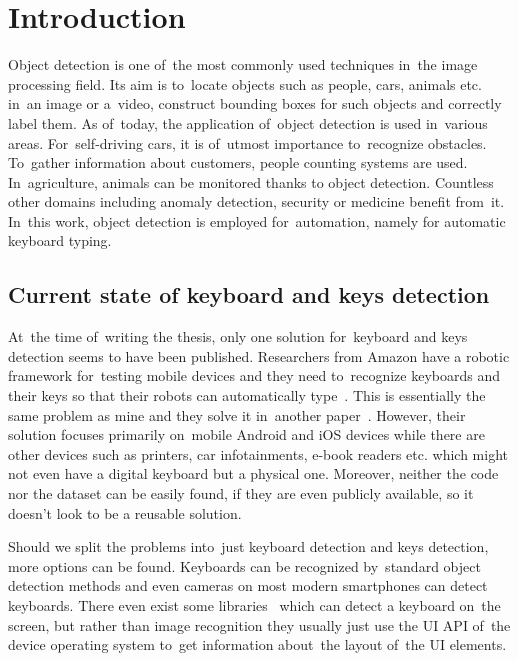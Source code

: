 \chapter{Introduction}
\label{introduction}

Object detection is one of~the most commonly used techniques in~the image processing field. Its aim is to~locate objects such as people, cars, animals etc. in~an image or a~video, construct bounding boxes for such objects and correctly label them. As of~today, the application of~object detection is used in~various areas. For~self-driving cars, it is of~utmost importance to~recognize obstacles. To~gather information about customers, people counting systems are used. In~agriculture, animals can be monitored thanks to object detection. Countless other domains including anomaly detection, security or medicine benefit from~it. In~this work, object detection is employed for~automation, namely for automatic keyboard typing.

\section{Current state of keyboard and keys detection}
\label{introduction-current-state}
At~the time of~writing the thesis, only one solution for~keyboard and keys detection seems to have been published. Researchers from Amazon have a robotic framework for~testing mobile devices and they need to~recognize keyboards and their keys so that their robots can automatically type~\cite{amazon-framework}. This is essentially the same problem as mine and they solve it in~another paper~\cite{amazon-paper}. However, their solution focuses primarily on~mobile Android and iOS devices while there are other devices such as printers, car infotainments, e-book readers etc. which might not even have a digital keyboard but a physical one. Moreover, neither the code nor the dataset can be easily found, if they are even publicly available, so it doesn't look to be a reusable solution.

Should we split the problems into~just keyboard detection and keys detection, more options can be found. Keyboards can be recognized by~standard object detection methods and even cameras on most modern smartphones can detect keyboards. There even exist some libraries~\cite{github-keyboard-1, github-keyboard-2} which can detect a keyboard on~the screen, but rather than image recognition they usually just use the UI API of~the device operating system to~get information about~the layout of~the UI elements.

